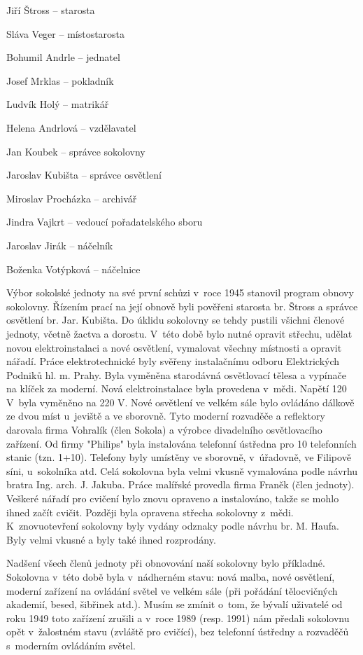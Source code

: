 \documentclass[a5paper, 11pt, twoside]{article}
\begin{document}
\vspace*{6pt}
Jiří Štross -- starosta

Sláva Veger -- místostarosta

Bohumil Andrle -- jednatel

Josef Mrklas -- pokladník

Ludvík Holý -- matrikář

Helena Andrlová -- vzdělavatel

Jan Koubek -- správce sokolovny

Jaroslav Kubišta -- správce osvětlení

Miroslav Procházka -- archivář

Jindra Vajkrt -- vedoucí pořadatelského sboru

Jaroslav Jirák -- náčelník

Boženka Votýpková -- náčelnice
\vspace*{6pt}

Výbor sokolské jednoty na své první schůzi v~roce 1945 stanovil program
obnovy sokolovny. Řízením prací na její obnově byli pověřeni starosta
br. Štross a správce osvětlení br. Jar. Kubišta. Do úklidu sokolovny se
tehdy pustili všichni členové jednoty, včetně žactva a dorostu. V~této
době bylo nutné opravit střechu, udělat novou elektroinstalaci a nové
osvětlení, vymalovat všechny místnosti a opravit nářadí. Práce
elektrotechnické byly svěřeny instalačnímu odboru Elektrických Podniků
hl. m. Prahy. Byla vyměněna starodávná osvětlovací tělesa a vypínače na
klíček za moderní. Nová elektroinstalace byla provedena v~mědi. Napětí
120 V~byla vyměněno na 220 V. Nové osvětlení ve velkém sále bylo
ovládáno dálkově ze dvou míst u~jeviště a ve sborovně. Tyto moderní
rozvaděče a reflektory darovala firma Vohralík (člen Sokola) a výrobce
divadelního osvětlovacího zařízení. Od firmy "Philips" byla instalována
telefonní ústředna pro 10 telefonních stanic (tzn. 1+10). Telefony byly
umístěny ve sborovně, v~úřadovně, ve Filipově síni, u~sokolníka atd.
Celá sokolovna byla velmi vkusně vymalována podle návrhu bratra Ing.
arch. J. Jakuba. Práce malířské provedla firma Franěk (člen jednoty).
Veškeré nářadí pro cvičení bylo znovu opraveno a instalováno, takže se
mohlo ihned začít cvičit. Později byla opravena střecha sokolovny
z~mědi. K~znovuotevření sokolovny byly vydány odznaky podle návrhu br. M.
Haufa. Byly velmi vkusné a byly také ihned rozprodány.

Nadšení všech členů jednoty při obnovování naší sokolovny bylo
příkladné. Sokolovna v~této době byla v~nádherném stavu: nová malba,
nové osvětlení, moderní zařízení na ovládání světel ve velkém sále (při
pořádání tělocvičných akademií, besed, šibřinek atd.). Musím se zmínit
o~tom, že bývalí uživatelé od roku 1949 toto zařízení zrušili a v~roce
1989 (resp. 1991) nám předali sokolovnu opět v~žalostném stavu (zvláště
pro cvičící), bez telefonní ústředny a rozvaděčů s~moderním ovládáním
světel.
\end{document}
